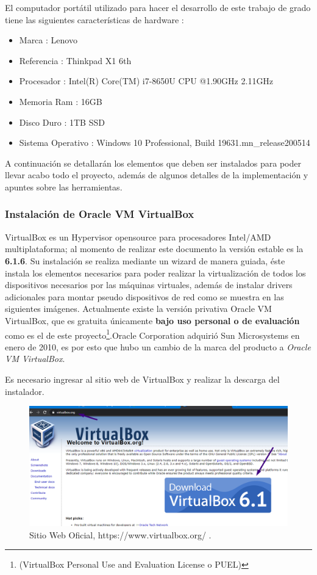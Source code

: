 \documentclass[letterpaper, 12pt, oneside]{article}
\begin{document}
    El computador portátil utilizado para hacer el desarrollo de este trabajo de grado tiene las siguientes características de hardware : 
    \begin{itemize}
        \item Marca : Lenovo
        \item Referencia : Thinkpad X1 6th
        \item Procesador : Intel(R) Core(TM) i7-8650U CPU @1.90GHz 2.11GHz 
        \item Memoria Ram : 16GB
        \item Disco Duro : 1TB SSD 
        \item Sistema Operativo : Windows 10 Professional, Build 19631.mn\_release200514
    \end{itemize}
    
    A continuación se detallarán los elementos que deben ser instalados para poder llevar acabo todo el proyecto, además de algunos detalles de la implementación y apuntes sobre las herramientas.
    
    \subsubsection{Instalación de Oracle VM VirtualBox}
    VirtualBox es un Hypervisor opensource para procesadores Intel/AMD multiplataforma; al momento de realizar este documento la versión estable es la \textbf{6.1.6}. Su instalación se realiza mediante un wizard de manera guiada, éste instala los elementos necesarios para poder realizar la virtualización de todos los dispositivos necesarios por las máquinas virtuales, además de instalar drivers adicionales para montar pseudo dispositivos de red como se muestra en las siguientes imágenes. 
    Actualmente existe la versión privativa Oracle VM VirtualBox, que es gratuita únicamente \textbf{bajo uso personal o de evaluación} como es el de este proyecto\footnote{(VirtualBox Personal Use and Evaluation License o PUEL)}.Oracle Corporation adquirió Sun Microsystems en enero de 2010, es por esto que hubo un cambio de la marca del producto a \textit{Oracle VM VirtualBox}\cite{oracle}.
    
    Es necesario ingresar al sitio web de VirtualBox y realizar la descarga del instalador.
    \begin{center}
    \begin{figure}[H]
        \includegraphics[scale=1]{img/install/virtualbox1.png}
        \caption{Sitio Web Oficial, https://www.virtualbox.org/ .}
        \label{fig:vbox1}
    \end{figure}
    \end{center}
\end{document}
